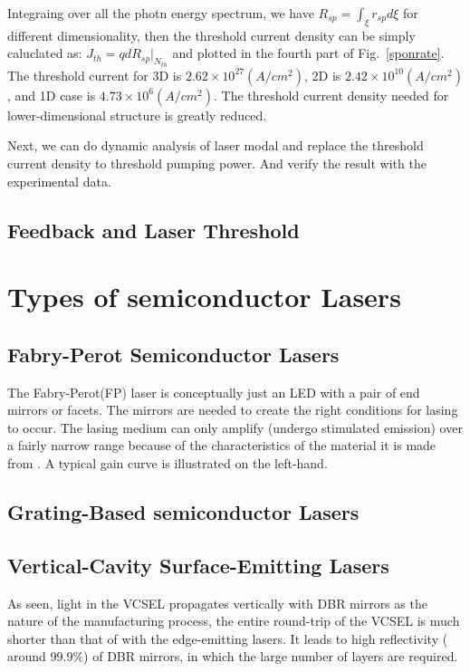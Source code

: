 Integraing over all the photn energy spectrum, we have $R_{sp} =
\int_{\xi}r_{sp}d{\xi}$ for different dimensionality, then the threshold
current density can be simply caluclated as: $J_{th}= qdR_{sp}|_{N_{th}}$ and
plotted in the fourth part of Fig.~\ref{sponrate}. The threshold current for 3D
is $2.62\times10^{27} (A/cm^2)$, 2D is $2.42\times10^{10} (A/cm^2)$, and 1D
case is $4.73\times10^{6} (A/cm^2)$. The threshold current density needed for
lower-dimensional structure is greatly reduced.

Next, we can do dynamic analysis of laser modal and replace the threshold
current density to threshold pumping power. And verify the result with the
experimental data.

\subsection{Feedback and Laser Threshold}
\section{Types of semiconductor Lasers} \label{corrections}
\subsection{Fabry-Perot Semiconductor Lasers}

The Fabry-Perot(FP) laser is conceptually just an LED with a pair of end
mirrors or facets. The mirrors are needed to create the right conditions for
lasing to occur. The lasing medium can only amplify (undergo stimulated
emission) over a fairly narrow range because of the characteristics of the
material it is made from . A typical gain curve is illustrated on the
left-hand. 

\subsection{Grating-Based semiconductor Lasers}
\subsection{Vertical-Cavity Surface-Emitting Lasers}

As seen, light in the VCSEL propagates vertically with DBR mirrors as the
nature of the manufacturing process, the entire round-trip of the VCSEL is much
shorter than that of with the edge-emitting lasers. It leads to high
reflectivity ( around 99.9$\%$) of DBR mirrors, in which the large number of
layers are required.

